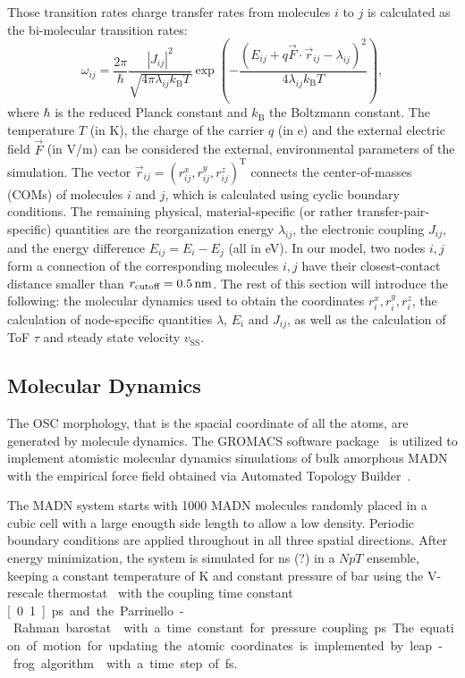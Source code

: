 \documentclass[%
 reprint,
superscriptaddress,
 amsmath,amssymb,
 aps,
prb,
floatfix
]{revtex4-2}
\begin{document}
Those transition rates charge transfer rates from molecules $i$ to $j$ is calculated as the bi-molecular transition rates:
%
\begin{equation}
    \omega_{ij} = \frac{2\pi}{\hbar} \frac{|J_{ij}|^2}{\sqrt{4\pi \lambda_{ij} k_\text{B}T}} \exp\left(-\frac{(E_{ij} + q \vec{F} \cdot \vec{r}_{ij} - \lambda_{ij})^2}{4\lambda_{ij} k_\text{B}T}\right) ,
    \label{equ:Marcus}
\end{equation}
%
where $\hbar$ is the reduced Planck constant and $k_\text{B}$ the Boltzmann constant. The temperature $T$ (in \unit[]{K}), the charge of the carrier $q$ (in \unit[]{e}) and the external electric field $\vec{F}$ (in V/m) can be considered the external, environmental parameters of the simulation. The vector $\vec{r}_{ij} = (r^x_{ij},r^y_{ij},r^z_{ij})^\text{T}$ connects the center-of-masses (COMs) of molecules $i$ and $j$, which is calculated using cyclic boundary conditions. 
The remaining physical, material-specific (or rather transfer-pair-specific) quantities are the reorganization energy $\lambda_{ij}$, the electronic coupling $J_{ij}$, and the energy difference $E_{ij} = E_i - E_j$ (all in \unit[]{eV}). 
In our model, two nodes $i,j$ form a connection of the corresponding molecules $i,j$ have their closest-contact distance smaller than $r_\text{cutoff}=\unit[0.5]{nm}$.
The rest of this section will introduce the following: the molecular dynamics used to obtain the coordinates $r^x_{i},r^y_{i},r^z_{i}$, the calculation of node-specific quantities $\lambda$, $E_i$ and $J_{ij}$, as well as the calculation of ToF $\tau$ and steady state velocity $v_\text{SS}$.

\subsection{Molecular Dynamics}
The OSC morphology, that is the spacial coordinate of all the atoms, are generated by molecule dynamics. The GROMACS software package~\cite{berendsen_gromacs_1995} is utilized to implement atomistic molecular dynamics simulations of bulk amorphous MADN with the empirical force field obtained via Automated Topology Builder~\cite{stroet_automated_2018}.

The MADN system starts with 1000 MADN molecules randomly placed in a cubic cell with a large enougth side length to allow a low density. Periodic boundary conditions are applied throughout in all three spatial directions. After energy minimization, the system is simulated for \unit[1]{ns} (?) in a $NpT$ ensemble, keeping a constant temperature of \unit[300]{K} and constant pressure of \unit[1]{bar} using the V-rescale thermostat~\cite{bussi_canonical_2007} with the coupling time constant \unit[0.1]{ps} and the Parrinello-Rahman barostat~\cite{parrinello_polymorphic_1981} with a time constant for pressure coupling \unit[2]{ps}. 
The equation of motion for updating the atomic coordinates is implemented by leap-frog algorithm~\cite{van_gunsteren_leap} with a time step of \unit[1]{fs}. 
\end{document}
